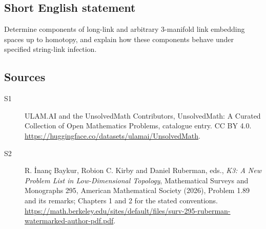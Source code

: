 \documentclass[11pt]{article}
\begin{document}
\subsection{Short English statement}
Determine components of long-link and arbitrary 3-manifold link embedding spaces up to homotopy, and explain how these components behave under specified string-link infection.
\subsection{Sources}
\begin{description}
\item[\hypertarget{source:statement:1}{S1}] ULAM.AI and the UnsolvedMath Contributors, UnsolvedMath: A Curated Collection of Open Mathematics Problems, catalogue entry. CC BY 4.0. \url{https://huggingface.co/datasets/ulamai/UnsolvedMath}.
\item[\hypertarget{source:statement:2}{S2}] R. İnanç Baykur, Robion C. Kirby and Daniel Ruberman, eds., \emph{K3: A New Problem List in Low-Dimensional Topology}, Mathematical Surveys and Monographs 295, American Mathematical Society (2026), Problem 1.89 and its remarks; Chapters 1 and 2 for the stated conventions. \url{https://math.berkeley.edu/sites/default/files/surv-295-ruberman-watermarked-author-pdf.pdf}.
\end{description}
\label{end:statement}
\end{document}
